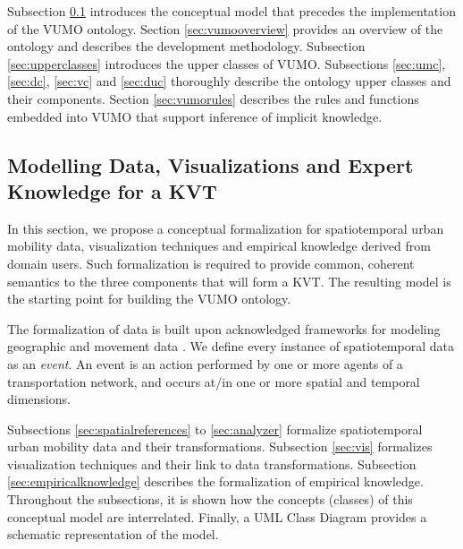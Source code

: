 \documentclass[]{interact}
\theoremstyle{plain}%
\theoremstyle{definition}
\theoremstyle{remark}
\theoremstyle{definition}
\begin{document}
Subsection \ref{sec:modelling} introduces the conceptual model that precedes the implementation of the VUMO ontology. Section \ref{sec:vumooverview} provides an overview of the ontology and describes the development methodology. Subsection \ref{sec:upperclasses} introduces the upper classes of VUMO. Subsections \ref{sec:umc}, \ref{sec:dc}, \ref{sec:vc} and \ref{sec:duc} thoroughly describe the ontology upper classes and their components. Section \ref{sec:vumorules} describes the rules and functions embedded into VUMO that support inference of implicit knowledge.

\subsection{Modelling Data, Visualizations and Expert Knowledge for a KVT}
\label{sec:modelling}

In this section, we propose a conceptual formalization for spatiotemporal urban mobility data, visualization techniques and empirical knowledge derived from domain users. Such formalization is required to provide common, coherent semantics to the three components that will form a KVT. The resulting model is the starting point for building the VUMO ontology. 


The formalization of data is built upon acknowledged frameworks for modeling geographic and movement data \citep{Aigner2011,EDA,Chrisman1997,Peuquet2002}. We define every instance of spatiotemporal data as an \emph{event}. An event is an action performed by one or more agents of a transportation network, and occurs at/in one or more spatial and temporal dimensions.

Subsections \ref{sec:spatialreferences} to \ref{sec:analyzer} formalize spatiotemporal urban mobility data and their transformations. Subsection \ref{sec:vis} formalizes visualization techniques and their link to data transformations. Subsection \ref{sec:empiricalknowledge} describes the formalization of empirical knowledge. Throughout the subsections, it is shown how the concepts (classes) of this conceptual model are interrelated. Finally, a UML Class Diagram provides a schematic representation of the model.
\end{document}

